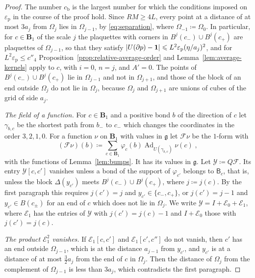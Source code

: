 \documentclass[11pt]{preprint}
\newcommand{\id}{\mathbf 1}
\newcommand{\Ad}{\operatorname{Ad}}
\DeclarePairedDelimiter{\abs}{\lvert}{\rvert}
\numberwithin{equation}{section}
\begin{document}
\begin{proof}
The number $c_{\mathrm b}$ is the largest number for which the conditions imposed on $\varepsilon_{\mathrm p}$ in the course of the proof hold. Since $RM \geqslant 4L$, every point at a distance of at most $3a_j$ from $\Omega_j$ lies in $\Omega_{j-1}$, by \eqref{eq:separation}, where $\Omega_{-1} \coloneqq \Omega_0$. In particular, for $c \in \mathbf B_1$ of the scale $j$ the plaquettes with corners in $B^j(c_-) \cup B^j(c_+)$ are plaquettes of $\Omega_{j-1}$, so that they satisfy $\abs{U(\partial p) - \id} \leqslant L^2\varepsilon_{\mathrm p}(\eta/a_j)^2$, and for $L^2\varepsilon_{\mathrm p} \leqslant c''_4$ Proposition~\ref{prop:relative-average-order} and Lemma~\ref{lem:average-kernels} apply to $c$, with $i = 0$, $n = j$, and $A' = 0$. The points of $B^j(c_-) \cup B^j(c_+)$ lie in $\Omega_{j-1}$ and not in $\Omega_{j+1}$, and those of the block of an end outside $\Omega_j$ do not lie in $\Omega_j$, because $\Omega_j$ and $\Omega_{j+1}$ are unions of cubes of the grid of side $a_j$.

\emph{The field of a function.} For $c \in \mathbf B_1$ and a positive bond $b$ of the direction of $c$ let $\gamma_{b,c}$ be the shortest path from $b_-$ to $c_-$ which changes the coordinates in the order $3, 2, 1, 0$. For a function $\nu$ on $\mathbf B_1$ with values in $\mathfrak g$ let $\mathcal F\nu$ be the $1$-form with
\[
    (\mathcal F\nu)(b) \coloneqq \sum_{c \in \mathbf B_1}\varphi_c(b)\Ad_{U(\gamma_{b,c})}\nu(c)\;,
\]
with the functions of Lemma~\ref{lem:bumps}. It has its values in $\mathfrak g$. Let $\mathcal Y \coloneqq Q\mathcal F$. Its entry $\mathcal Y[c, c']$ vanishes unless a bond of the support of $\varphi_{c'}$ belongs to $\mathsf B_c$, that is, unless the block $\Delta(y_{c'})$ meets $B^j(c_-) \cup B^j(c_+)$, where $j \coloneqq j(c)$. By the first paragraph this requires $j(c') = j$ and $y_{c'} \in \{ c_-, c_+ \}$, or $j(c') = j - 1$ and $y_{c'} \in B(c_\pm)$ for an end of $c$ which does not lie in $\Omega_j$. We write $\mathcal Y = I + \mathcal E_0 + \mathcal E_1$, where $\mathcal E_1$ has the entries of $\mathcal Y$ with $j(c') = j(c) - 1$ and $I + \mathcal E_0$ those with $j(c') = j(c)$.

\emph{The product $\mathcal E_1^2$ vanishes.} If $\mathcal E_1[c, c']$ and $\mathcal E_1[c', c'']$ do not vanish, then $c'$ has an end outside $\Omega_{j-1}$, which is at the distance $a_{j-1}$ from $y_{c'}$, and $y_{c'}$ is at a distance of at most $\frac{3}{2}a_j$ from the end of $c$ in $\Omega_j$. Then the distance of $\Omega_j$ from the complement of $\Omega_{j-1}$ is less than $3a_j$, which contradicts the first paragraph.


\end{proof}
\end{document}
